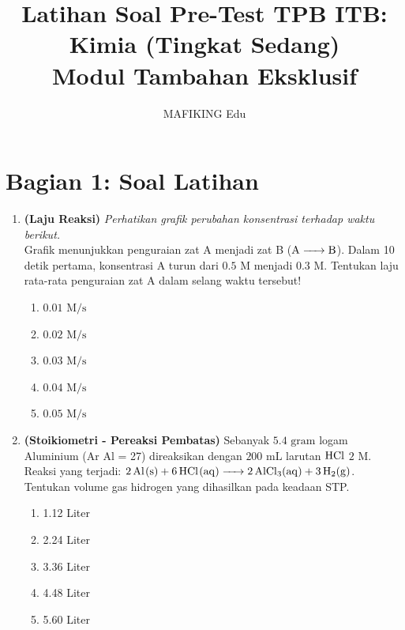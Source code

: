 \documentclass[12pt,a4paper]{article}
\title{\textbf{Latihan Soal Pre-Test TPB ITB: Kimia (Tingkat Sedang)}\\ \large Modul Tambahan Eksklusif}
\author{MAFIKING Edu}
\date{}
\begin{document}
\maketitle

\section*{Bagian 1: Soal Latihan}

\begin{enumerate}
    \item \textbf{(Laju Reaksi)} \textit{Perhatikan grafik perubahan konsentrasi terhadap waktu berikut.} \\
    Grafik menunjukkan penguraian zat A menjadi zat B ($\ce{A -> B}$). Dalam 10 detik pertama, konsentrasi A turun dari $0.5 \text{ M}$ menjadi $0.3 \text{ M}$. Tentukan laju rata-rata penguraian zat A dalam selang waktu tersebut!
    \begin{center}
    \end{center}
    \begin{enumerate}[label=\alph*.]
        \item $0.01 \text{ M/s}$
        \item $0.02 \text{ M/s}$
        \item $0.03 \text{ M/s}$
        \item $0.04 \text{ M/s}$
        \item $0.05 \text{ M/s}$
    \end{enumerate}

    \item \textbf{(Stoikiometri - Pereaksi Pembatas)} Sebanyak $5.4 \text{ gram}$ logam Aluminium (Ar Al = 27) direaksikan dengan $200 \text{ mL}$ larutan $\ce{HCl}$ $2 \text{ M}$. Reaksi yang terjadi: $\ce{2Al(s) + 6HCl(aq) -> 2AlCl3(aq) + 3H2(g)}$. Tentukan volume gas hidrogen yang dihasilkan pada keadaan STP.
    \begin{enumerate}[label=\alph*.]
        \item 1.12 Liter
        \item 2.24 Liter
        \item 3.36 Liter
        \item 4.48 Liter
        \item 5.60 Liter
    \end{enumerate}


\end{enumerate}
\end{document}
